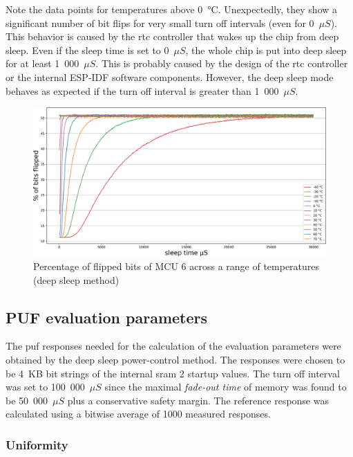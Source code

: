 Note the data points for temperatures above 0~°C. Unexpectedly, they show a significant number of bit flips for very small turn off intervals (even for 0~$\mu{}S$). This behavior is caused by the \gls{rtc} controller that wakes up the chip from deep sleep. Even if the sleep time is set to 0~$\mu{}S$, the whole chip is put into deep sleep for at least 1~000~$\mu{}S$. This is probably caused by the design of the \gls{rtc} controller or the internal ESP-IDF software components. However, the deep sleep mode behaves as expected if the turn off interval is greater than 1~000~$\mu{}S$.

\begin{figure}[ht!]
    \centering
    \captionsetup{justification=centering,margin=0.5cm}
    \includegraphics[width=\textwidth]{images/6_across_temps_deep_sleep.png}
    \caption{Percentage of flipped bits of MCU 6 across a range of temperatures (deep sleep method)}
    \label{fig:6_across_temps_deep_sleep}
\end{figure}
\subsection{PUF evaluation parameters}\label{sec:deepsleep_evaluation}

The \gls{puf} responses needed for the calculation of the evaluation parameters were obtained by the deep sleep power-control method. The responses were chosen to be 4~KB bit strings of the internal \gls{sram} 2 startup values. The turn off interval was set to 100~000~$\mu{}S$ since the maximal \emph{fade-out time} of memory was found to be 50~000~$\mu{}S$ plus a conservative safety margin. The reference response was calculated using a bitwise average of 1000 measured responses.

\subsubsection*{Uniformity}

